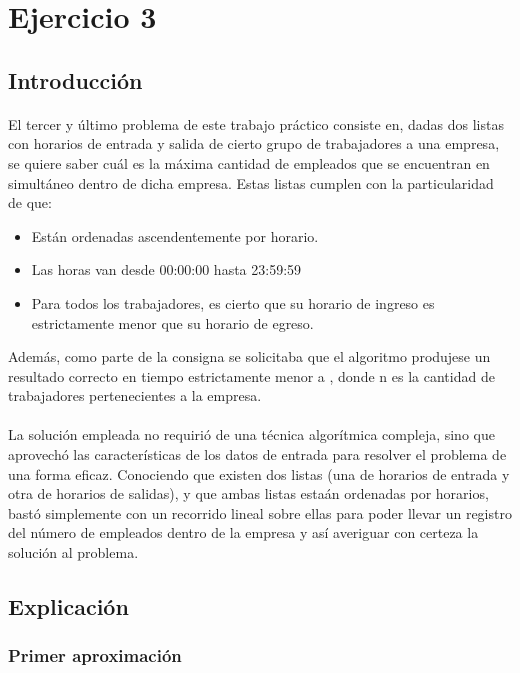 \section{Ejercicio 3}

\subsection{Introducción}

\paragraph{}
El tercer y \'ultimo problema de este trabajo pr\'actico consiste en, dadas dos listas con horarios de entrada y salida de cierto grupo de trabajadores a una empresa, se quiere saber cu\'al es la m\'axima cantidad de empleados que se encuentran en simult\'aneo dentro de dicha empresa. Estas listas cumplen con la particularidad de que:
	\begin{itemize}
		\item Están ordenadas ascendentemente por horario.
		\item Las horas van desde 00:00:00 hasta 23:59:59
		\item Para todos los trabajadores, es cierto que su horario de ingreso es estrictamente menor que su horario de egreso.
	\end{itemize}
Adem\'as, como parte de la consigna se solicitaba que el algoritmo produjese un resultado correcto en tiempo estrictamente menor a , donde n es la cantidad de trabajadores pertenecientes a la empresa.

\paragraph{}
La solución empleada no requiri\'o de una t\'ecnica algor\'itmica compleja, sino que aprovech\'o las características de los datos de entrada para resolver el problema de una forma eficaz. Conociendo que existen dos listas (una de horarios de entrada y otra de horarios de salidas), y que ambas listas esta\'an ordenadas por horarios, bastó simplemente con un recorrido lineal sobre ellas para poder llevar un registro del número de empleados dentro de la empresa y así averiguar con certeza la solución al problema.


\subsection{Explicación}
\subsubsection{Primer aproximación}
\label{explicacion}

